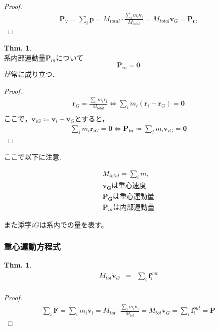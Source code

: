 \documentclass[dvipdfmx,uplatex]{jsarticle}
\theoremstyle{definition}
\newtheorem{theo}[law]{Thm.}
\begin{document}
\begin{proof}
  \begin{align*}
    \bm{P}_{\forall} = \sum_i \bm{p} = M_{total} \cdot \frac{\sum\limits_i m_i \bm{v_i}}{M_{total}} = M_{total} \bm{v}_G = \bm{P_G}
  \end{align*}
\end{proof}

\begin{theo}\mbox{}\\
  系内部運動量$\bm{P}_{in}$について
  \begin{equation*}
    \bm{P}_{in} = \bm{0}
  \end{equation*}
  が常に成り立つ．
\end{theo}

\begin{proof}
  \begin{align*}
    \bm{r}_G = \frac{\sum\limits_i m_i \bm{r_i}}{M_{total}} \iff \sum_i m_i (\bm{r}_i - \bm{r}_G) = \bm{0}\\
  \end{align*}
  ここで，$\bm{v}_{iG} \coloneqq \bm{v}_i - \bm{v}_G$とすると，
  \begin{align*}
    \sum_i m_i \bm{r}_{iG} = \bm{0} \iff \bm{P_{in}} \coloneqq \sum_i m_i \bm{v}_{iG} = \bm{0}
  \end{align*}
\end{proof}

ここで以下に注意.

\begin{eqnarray*}
  M_{total} = \sum_i m_i \\
  \bm{v_G} は重心速度 \\
  \bm{P_G} は重心運動量 \\
  \bm{P}_{in}　は内部運動量
\end{eqnarray*}

また添字$iG$は系内での量を表す。

\subsubsection{重心運動方程式}
\begin{theo}
  \begin{eqnarray*}
    M_{tot} \dot{\bm{v}}_G &=& \sum_i \bm{f}^{out}_i \\
  \end{eqnarray*}
\end{theo}

\begin{proof}
  \begin{align*}
    \sum_i \bm{F} = \sum_i m_i \bm{v}_i
    = M_{tot} \cdot \frac{\sum\limits_i m_i \bm{v}_i}{M_{tot}}
    = M_{tot} \dot{\bm{v}}_G = \sum_i \bm{f}_i^{out} = \dot{\bm{P}}
  \end{align*}
\end{proof}
\end{document}

